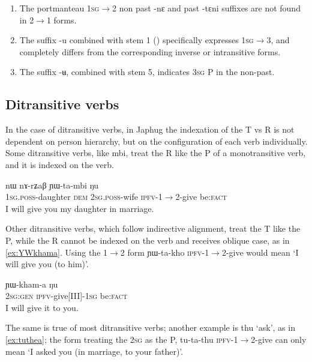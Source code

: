\documentclass[oldfontcommands,oneside,a4paper,11pt]{article}
\newcommand{\ipa}[1]{{\phon \mbox{#1}}} %
\begin{document}
\begin{enumerate}
\item The portmanteau \textsc{1sg$\rightarrow$2} non past \ipa{-nɛ} and past \ipa{-tɛni} suffixes are not found in 2$\rightarrow$1 forms.
\item The suffix \ipa{-u}  combined with stem 1 (\citealt[1104]{jacques12khaling}) specifically expresses \textsc{1sg$\rightarrow$3}, and completely differs from the corresponding inverse or intransitive forms.
\item The suffix \ipa{-ʉ}, combined with stem 5, indicates \textsc{3sg} P in the non-past.
\end{enumerate}


\subsection{Ditransitive verbs}
In the case of ditransitive verbs, in Japhug the indexation of the T vs R is not dependent on person hierarchy, but on the configuration of each verb individually. Some ditransitive verbs, like \ipa{mbi}, treat the R like the P of a monotransitive verb, and it is indexed on the verb.

\begin{exe}
\ex \label{ex:YWtambi}
\gll \ipa{a-me} 	\ipa{nɯ} 	\ipa{nɤ-rʑaβ} 	\ipa{ɲɯ-ta-mbi} 	\ipa{ŋu} \\
\textsc{1sg.poss}-daughter \textsc{dem} \textsc{2sg.poss}-wife \textsc{ipfv}-1$\rightarrow$2-give be:\textsc{fact} \\
\glt I will give you my daughter in marriage.
\end{exe}

Other ditransitive verbs, which follow indirective alignment, treat the T like the P, while the R cannot be indexed on the verb and receives oblique case, as in \ref{ex:YWkhama}. Using the 1$\rightarrow$2 form \ipa{ɲɯ-ta-kho} \textsc{ipfv}-1$\rightarrow$2-give would mean `I will give you (to him)'.

\begin{exe}
\ex \label{ex:YWkhama}
\gll \ipa{nɤʑɯɣ} 	\ipa{ɲɯ-kham-a} \ipa{ŋu} \\
\textsc{2sg:gen} \textsc{ipfv}-give[III]-\textsc{1sg} be:\textsc{fact} \\
\glt I will give it to you.
\end{exe}

The same is true of most ditransitive verbs; another example is \ipa{thu} `ask', as in \ref{ex:tuthea}; the form treating the \textsc{2sg} as the P, \ipa{tu-ta-thu} \textsc{ipfv}-1$\rightarrow$2-give can only mean `I asked you (in marriage, to your father)'.
\end{document}
